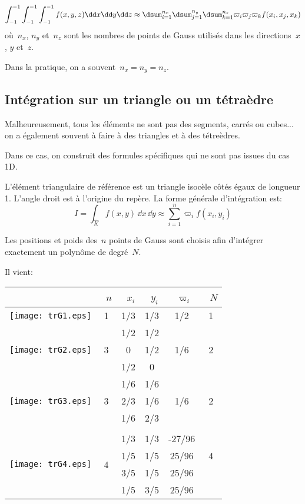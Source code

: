 \begin{equation} \int_{-1}^{-1}\int_{-1}^{-1}\int_{-1}^{-1} f(x,y,z)\dd x\dd y\dd z \approx
\dsum_{i=1}^{n_x}\dsum_{j=1}^{n_y}\dsum_{k=1}^{n_z} \varpi_i\varpi_j\varpi_k f(x_i,x_j,x_k)\end{equation}
où~$n_x$, $n_y$ et~$n_z$ sont les nombres de points de Gauss utilisés dans
les directions~$x$, $y$ et~$z$.

Dans la pratique, on a souvent~$n_x=n_y=n_z$.


\medskip
\subsection*{Intégration sur un triangle ou un tétraèdre}

Malheureusement, tous les éléments ne sont pas des segments, carrés ou cubes...
on a également souvent à faire à des triangles et à des tétreèdres.

Dans ce cas, on construit des formules spécifiques qui ne sont pas issues du cas 1D.

L'élément triangulaire de référence est un triangle isocèle côtés égaux
de longueur 1. L'angle droit est à l'origine du repère. La forme générale d'intégration est:
\begin{equation}
I=\int_{\hat{K}} f(x,y)\,\dd x\,\dd y \approx \sum_{i=1}^n \varpi_if(x_i,y_i)
\end{equation}

\medskip
Les positions et poids des~$n$ points de Gauss 
sont choisis afin d'intégrer exactement un polynôme de degré~$N$.

Il vient:
\begin{center}
\begin{tabular}{cccccc}
 &~$n$ &~$x_i$ &~$y_i$ &~$\varpi_i$ &~$N$\\
\hline
\texttt{[image: trG1.eps]} & 1 & 1/3 & 1/3 & 1/2 & 1\\
\hline
\multirow{3}{*}{\texttt{[image: trG2.eps]}} &
\multirow{3}{*}{3} & 1/2 & 1/2 & \multirow{3}{*}{1/6} & \multirow{3}{*}{2}\\[+2mm]
&&0&1/2&&\\[+2mm]
&&1/2&0&&\\[+2mm]
\hline
\multirow{3}{*}{\texttt{[image: trG3.eps]}} &
\multirow{3}{*}{3} & 1/6 & 1/6 & \multirow{3}{*}{1/6} & \multirow{3}{*}{2}\\[+2mm]
&&2/3 & 1/6 &&\\[+2mm]
&&1/6&2/3&&\\[+2mm]
\\
\hline
\multirow{4}{*}{\texttt{[image: trG4.eps]}} & 
\multirow{4}{*}{4} & 1/3 & 1/3 & -27/96 & \multirow{3}{*}{4}\\[+2mm]
&&1/5&1/5&25/96&\\[+2mm]
&&3/5&1/5&25/96&\\[+2mm]
&&1/5&3/5&25/96&\\[+2mm]
\end{tabular}
\end{center}

